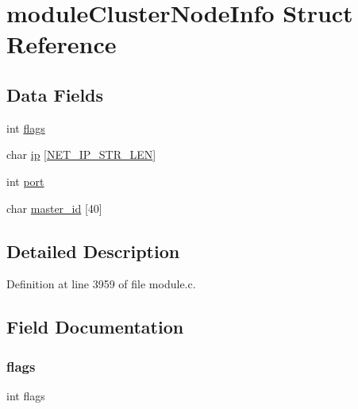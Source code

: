 \hypertarget{structmodule_cluster_node_info}{}\section{module\+Cluster\+Node\+Info Struct Reference}
\label{structmodule_cluster_node_info}
\subsection*{Data Fields}
\begin{DoxyCompactItemize}
\item 
int \hyperlink{structmodule_cluster_node_info_ac8bf36fe0577cba66bccda3a6f7e80a4}{flags}
\item 
char \hyperlink{structmodule_cluster_node_info_a9de2afd4e77c16f677244d244270b605}{ip} \mbox{[}\hyperlink{server_8h_ad97c5405ed22a94e9fcc10fba577d6c0}{N\+E\+T\+\_\+\+I\+P\+\_\+\+S\+T\+R\+\_\+\+L\+EN}\mbox{]}
\item 
int \hyperlink{structmodule_cluster_node_info_a63c89c04d1feae07ca35558055155ffb}{port}
\item 
char \hyperlink{structmodule_cluster_node_info_ab95368416ffd4d1b80277de1b0c2c32d}{master\+\_\+id} \mbox{[}40\mbox{]}
\end{DoxyCompactItemize}


\subsection{Detailed Description}


Definition at line 3959 of file module.\+c.



\subsection{Field Documentation}
\mbox{\label{structmodule_cluster_node_info_ac8bf36fe0577cba66bccda3a6f7e80a4}} 
\subsubsection{\texorpdfstring{flags}{flags}}
{\footnotesize\ttfamily int flags}



